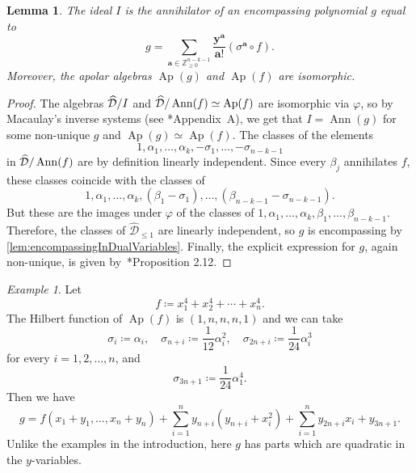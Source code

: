 \documentclass[a4paper,11pt,reqno]{amsart}
\newcommand{\bfa}{\mathbf{a}}
\newcommand{\bfy}{\mathbf{y}}
\newcommand{\calD}{\mathcal{D}}
\renewcommand{\hat}[1]{\widehat{#1}}
\DeclareMathOperator{\Ann}{Ann}
\DeclareMathOperator{\Ap}{Ap}
\numberwithin{equation}{section}
\theoremstyle{definition}
\theoremstyle{plain}
\newtheorem{lem}[defn]{Lemma}
\theoremstyle{remark}
\newtheorem{exam}[defn]{Example}
\begin{document}
\begin{lem}\label{lem:summary_of_coordinate_change}
    The ideal $I$ is the annihilator of an encompassing polynomial $g$ equal
    to
    \[
        g=\sum_{\bfa\in \mathbb{Z}_{\geq 0}^{n-k-1}} \frac{\bfy^{\bfa}}{\bfa!}(\sigma^{\bfa}\circ f).
    \]
    Moreover, the apolar algebras $\Ap(g)$ and $\Ap(f)$ are isomorphic.
\end{lem}
\begin{proof}
    The algebras $\lcalD/I$ and $\lcalD/\Ann(f) \simeq \Ap(f)$ are isomorphic
    via $\varphi$, so by Macaulay's inverse systems (see \cite{IK99}*{Appendix~A}), we get that $I = \Ann(g)$ for
    some non-unique $g$ and $\Ap(g) \simeq \Ap(f)$. The classes of the elements \[
    1,\alpha_1, \ldots ,\alpha_k,
    -\sigma_1, \ldots ,-\sigma_{n-k-1}\]
     in $\lcalD/\Ann(f)$ are by definition linearly
    independent. Since every $\beta_j$ annihilates $f$, these
    classes coincide with the classes of
    \[
        1,\alpha_1, \ldots ,\alpha_k, (\beta_1 - \sigma_1), \ldots
        ,(\beta_{n-k-1} - \sigma_{n-k-1}).
    \]
    But these are the images under $\varphi$ of the classes of $1,
    \alpha_1, \ldots ,\alpha_k, \beta_1, \ldots ,\beta_{n-k-1}$. Therefore,
    the classes of $\hat{\calD}_{\leq 1}$ are linearly independent, so $g$ is
    encompassing by \autoref{lem:encompassingInDualVariables}. Finally, the
    explicit expression for $g$, again non-unique, is given
    by~\cite{Jel17}*{Proposition 2.12}.
\end{proof}

\begin{exam}
    Let \[f \coloneqq x_1^4 + x_2^4+\cdots+x_n^4.\] The Hilbert function of $\Ap(f)$ is
    $(1,n,n,n,1)$ and we can take
    \[ \sigma_i \coloneqq \alpha_i,\quad \sigma_{n+i} \coloneqq \frac{1}{12}\alpha_i^2,\quad \sigma_{2n+i} \coloneqq
    \frac{1}{24}\alpha_i^3\] for every $i=1,2, \ldots ,n$, and
    \[ \sigma_{3n+1} \coloneqq \frac{1}{24}\alpha_1^4.\]
Then we have
\[ g = f(x_1+y_1, \ldots ,x_n+y_n) + \sum_{i=1}^{n} y_{n+i}(y_{n+i} +
        x_i^2) + \sum_{i=1}^n y_{2n+i} x_i + y_{3n+1}.
\]
Unlike the examples in the introduction, here $g$ has parts which
are quadratic in the $y$-variables.
\end{exam}
\end{document}
